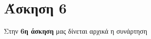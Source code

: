 \documentclass[Second Project.tex]{subfiles}
\begin{document}
\section{ Άσκηση 6 }
Στην \textbf{6η άσκηση} μας δίνεται αρχικά η συνάρτηση 
\end{document}
